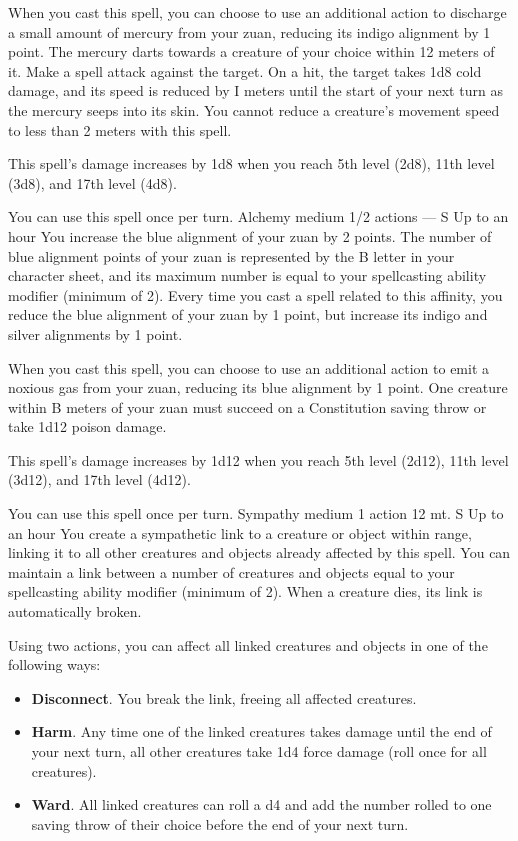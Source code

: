     When you cast this spell, you can choose to use an additional action to discharge a small amount of mercury from your zuan, reducing its indigo alignment by 1 point.
    The mercury darts towards a creature of your choice within 12 meters of it.
    Make a spell attack against the target.
    On a hit, the target takes 1d8 cold damage, and its speed is reduced by I meters until the start of your next turn as the mercury seeps into its skin.
    You cannot reduce a creature's movement speed to less than 2 meters with this spell.

    This spell's damage increases by 1d8 when you reach 5th level (2d8), 11th level (3d8), and 17th level (4d8).

    You can use this spell once per turn.
    {Alchemy medium}
    {1/2 actions}
    {---}
    {S}
    {Up to an hour}
    You increase the blue alignment of your zuan by 2 points.
    The number of blue alignment points of your zuan is represented by the B letter in your character sheet, and its maximum number is equal to your spellcasting ability modifier (minimum of 2).
    Every time you cast a spell related to this affinity, you reduce the blue alignment of your zuan by 1 point, but increase its indigo and silver alignments by 1 point.

    When you cast this spell, you can choose to use an additional action to emit a noxious gas from your zuan, reducing its blue alignment by 1 point.
    One creature within B meters of your zuan must succeed on a Constitution saving throw or take 1d12 poison damage.

    This spell's damage increases by 1d12 when you reach 5th level (2d12), 11th level (3d12), and 17th level (4d12).

    You can use this spell once per turn.
    {Sympathy medium}
    {1 action}
    {12 mt.}
    {S}
    {Up to an hour}
    You create a sympathetic link to a creature or object within range, linking it to all other creatures and objects already affected by this spell.
    You can maintain a link between a number of creatures and objects equal to your spellcasting ability modifier (minimum of 2).
    When a creature dies, its link is automatically broken.

    Using two actions, you can affect all linked creatures and objects in one of the following ways:
    \begin{itemize}
        \item \textbf{Disconnect}.
        You break the link, freeing all affected creatures.
        \item \textbf{Harm}.
        Any time one of the linked creatures takes damage until the end of your next turn, all other creatures take 1d4 force damage (roll once for all creatures).
        \item \textbf{Ward}.
        All linked creatures can roll a d4 and add the number rolled to one saving throw of their choice before the end of your next turn.
    \end{itemize}

\newpage~\newpage
